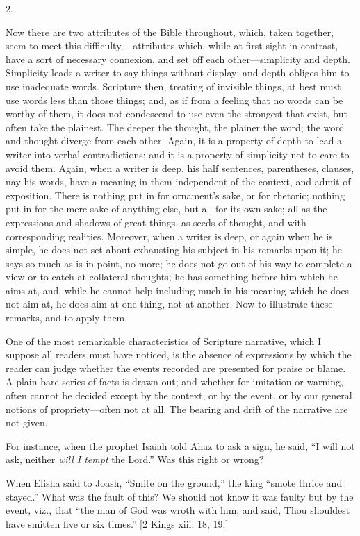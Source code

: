 2.

Now there are two attributes of the Bible throughout, which, taken
together, seem to meet this difficulty,—attributes which, while at
first sight in contrast, have a sort of necessary connexion, and
set off each other—simplicity and depth. Simplicity leads a writer
to say things without display; and depth obliges him to use inadequate
words. Scripture then, treating of invisible things, at best must use
words less than those things; and, as if from a feeling that no words
can be worthy of them, it does not condescend to use even the
strongest that exist, but often take the plainest. The deeper the
thought, the plainer the word; the word and thought diverge from each
other. Again, it is a property of depth to lead a writer into verbal
contradictions; and it is a property of simplicity not to care to
avoid them. Again, when a writer is deep, his half sentences,
parentheses, clauses, nay his words, have a meaning in them
independent of the context, and admit of exposition. There is nothing
put in for ornament's sake, or for rhetoric; nothing put in for the
mere sake of anything else, but all for its own sake; all as the
expressions and shadows of great things, as seeds of thought, and with
corresponding realities. Moreover, when a writer is deep, or again
when he is simple, he does not set about exhausting his subject in his
remarks upon it; he says so much as is in point, no more; he does not
go out of his way to complete a view or to catch at collateral
thoughts; he has something before him which he aims at, and, while he
cannot help including much in his meaning which he does not aim at, he
does aim at one thing, not at another. Now to illustrate these
remarks, and to apply them.

One of the most remarkable characteristics of Scripture narrative,
which I suppose all readers must have noticed, is the absence of
expressions by which the reader can judge whether the events recorded
are presented for praise or blame. A plain bare series of facts is drawn out; and whether for imitation or warning, often cannot be
decided except by the context, or by the event, or by our general
notions of propriety—often not at all. The bearing and drift of the
narrative are not given.

For instance, when the prophet Isaiah told Ahaz to ask a sign, he
said, ``I will not ask, neither \emph{will I tempt} the
Lord.'' Was this right or wrong?

When Elisha said to Joash, ``Smite on the ground,'' the
king ``smote thrice and stayed.'' What was the fault of this?
We should not know it was faulty but by the event, viz., that
``the man of God was wroth with him, and said, Thou shouldest have
smitten five or six times.'' [2 Kings xiii. 18, 19.]


